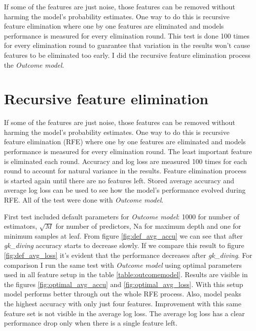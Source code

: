 If some of the features are just noise, those features can be removed without harming the model's probability estimates. One way to do this is recursive feature elimination where one by one features are eliminated and models performance is measured for every elimination round. This test is done 100 times for every elimination round to guarantee that variation in the results won't cause features to be eliminated too early. I did the recursive feature elimination process the \textit{Outcome model}.

\section{Recursive feature elimination}
If some of the features are just noise, those features can be removed without harming the model's probability estimates. One way to do this is recursive feature elimination (RFE) where one by one features are eliminated and models performance is measured for every elimination round. The least important feature is eliminated each round. Accuracy and log loss are measured 100 times for each round to account for natural variance in the results. Feature elimination process is started again until there are no features left. Stored average accuracy and average log loss can be used to see how the model's performance evolved during RFE. All of the test were done with \textit{Outcome model}.

First test included default parameters for \textit{Outcome model}: 1000 for number of estimators, $\sqrt{M}$ for number of predictors, Na for maximum depth and one for minimum samples at leaf. From figure \ref{fig:def_avg_accu} we can see that after \textit{gk\_diving} accuracy starts to decrease slowly. If we compare this result to figure \ref{fig:def_avg_loss}
it's evident that the performance decreases after \textit{gk\_diving}. For comparison I run the same test with \textit{Outcome model} using optimal parameters used in all feature setup in the table \ref{table:outcomemodel}. Results are visible in the figures \ref{fig:optimal_avg_accu} and \ref{fig:optimal_avg_loss}. With this setup model performs better through out the whole RFE process. Also, model peaks the highest accuracy with only just four features. Improvement with this same feature set is not visible in the average log loss. The average log loss has a clear performance drop only when there is a single feature left.

